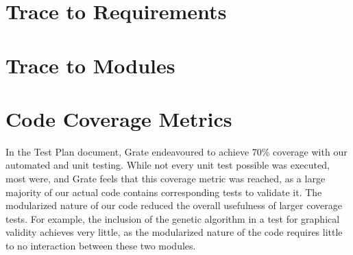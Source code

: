\documentclass[12pt, titlepage]{article}
\begin{document}
\section{Trace to Requirements}
		
\section{Trace to Modules}		

\section{Code Coverage Metrics}

In the Test Plan document, Grate endeavoured to achieve 70\% coverage with our automated and unit testing. While not every unit test possible was executed, most were, and Grate feels that this coverage metric was reached, as a large majority of our actual code contains corresponding tests to validate it. The modularized nature of our code reduced the overall usefulness of larger coverage tests. For example, the inclusion of the genetic algorithm in a test for graphical validity achieves very little, as the modularized nature of the code requires little to no interaction between these two modules.
\end{document}
